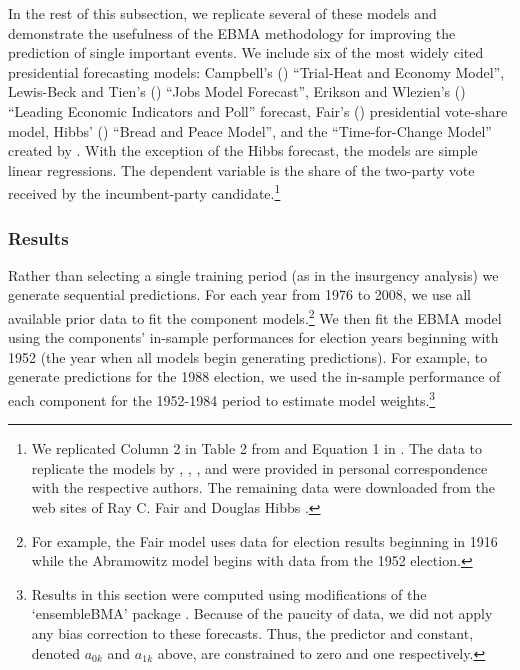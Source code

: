 \documentclass[pdftex,12pt,fullpage,oneside]{amsart}
\begin{document}
In the rest of this subsection, we replicate several of these models
and demonstrate the usefulness of the EBMA methodology for improving
the prediction of single important events.  We include six of the most
widely cited presidential forecasting models: Campbell's
(\citeyear{Campbell:2008}) ``Trial-Heat and Economy Model'',
Lewis-Beck and Tien's (\citeyear{Lewis-Beck:Tien:2008}) ``Jobs Model
Forecast'', Erikson and Wlezien's (\citeyear{Erikson:Wlezien:2008})
``Leading Economic Indicators and Poll'' forecast, Fair's
(\citeyear{Fair:2010}) presidential vote-share model, Hibbs'
(\citeyear{Hibbs:2000}) ``Bread and Peace Model'', and the
``Time-for-Change Model'' created by
\citet{Abramowitz:2008}.  \noindent With the exception of the Hibbs
forecast, the models are simple linear regressions. The dependent
variable is the share of the two-party vote received by the
incumbent-party candidate.\footnote{We replicated Column 2 in Table 2
  from \citet{Erikson:Wlezien:2008} and Equation 1 in
  \citet{Fair:2010}. The data to replicate the models by
  \citet{Abramowitz:2008}, \citet{Campbell:2008},
  \citet{Erikson:Wlezien:2008}, and \citet{Lewis-Beck:Tien:2008} were
  provided in personal correspondence with the respective authors.
  The remaining data were downloaded from the web sites of Ray C. Fair
  \nocite{Fair2011} and Douglas Hibbs \nocite{Hibbs2011}.}



\subsubsection{Results}

Rather than selecting a single training period (as in the insurgency
analysis) we generate sequential predictions.  For each year from 1976
to 2008, we use all available prior data to fit the component
models.\footnote{For example, the Fair model uses data for election
  results beginning in 1916 while the Abramowitz model begins with
  data from the 1952 election. }  We then fit the EBMA model using the
components' in-sample performances for election years beginning with
1952 (the year when all models begin generating predictions).  For
example, to generate predictions for the 1988 election, we used the
in-sample performance of each component for the 1952-1984 period to
estimate model weights.\footnote{Results in this section were computed
  using modifications of the `ensembleBMA' package
  \citep{Fraley:2010b, Fraley:Forthcoming}.  Because of the paucity of
  data, we did not apply any bias correction to these forecasts.  Thus,
  the predictor and constant, denoted $a_{0k}$ and $a_{1k}$ above, are
  constrained to zero and one respectively.}
\end{document}
